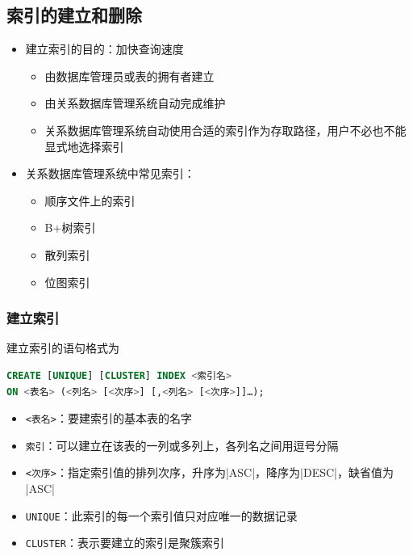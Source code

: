 \subsection{索引的建立和删除}
\begin{itemize}
    \item 建立索引的目的：加快查询速度
    \begin{itemize}
        \item 由数据库管理员或表的拥有者建立
        \item 由关系数据库管理系统自动完成维护
        \item 关系数据库管理系统自动使用合适的索引作为存取路径，用户不必也不能显式地选择索引
    \end{itemize}
    \item 关系数据库管理系统中常见索引：
    \vspace{-1em}
	\begin{multicols}{2}
        \begin{itemize}
            \item 顺序文件上的索引
            \item B+树索引
            \item 散列索引
            \item 位图索引
        \end{itemize}
	\end{multicols}
	\vspace{-1em}
\end{itemize}

\subsubsection{建立索引}
建立索引的语句格式为
\begin{lstlisting}[language=sql]
CREATE [UNIQUE] [CLUSTER] INDEX <索引名> 
ON <表名> (<列名> [<次序>] [,<列名> [<次序>]]…);
\end{lstlisting}

\begin{itemize}
    \item \verb|<表名>|：要建索引的基本表的名字
    \item \verb|索引|：可以建立在该表的一列或多列上，各列名之间用逗号分隔
    \item \verb|<次序>|：指定索引值的排列次序，升序为\sverb|ASC|，降序为\sverb|DESC|，缺省值为 \sverb|ASC|
    \item \verb|UNIQUE|：此索引的每一个索引值只对应唯一的数据记录
    \item \verb|CLUSTER|：表示要建立的索引是聚簇索引
\end{itemize}

